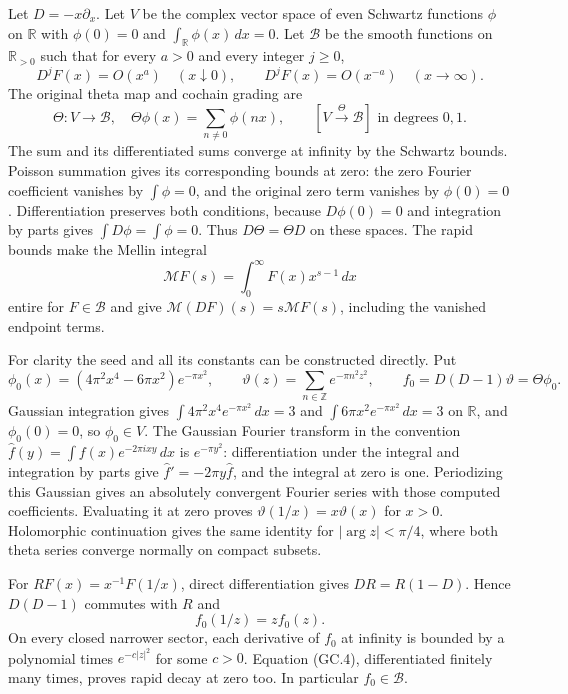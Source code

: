 \documentclass[11pt,a4paper]{article}
\begin{document}
Let $D=-x\partial_x$. Let $V$ be the complex vector space of even
Schwartz functions $\phi$ on $\mathbb R$ with
$\phi(0)=0$ and $\int_{\mathbb R}\phi(x)\,dx=0$. Let $\mathscr B$ be
the smooth functions on $\mathbb R_{>0}$ such that for every
$a>0$ and every integer $j\ge0$,
\[
 D^jF(x)=O(x^a)\quad(x\downarrow0),\qquad
 D^jF(x)=O(x^{-a})\quad(x\to\infty).
\]
The original theta map and cochain grading are
\[
 \Theta:V\longrightarrow\mathscr B,\quad
 \Theta\phi(x)=\sum_{n\ne0}\phi(nx),\qquad
 [V\xrightarrow{\Theta}\mathscr B]\text{ in degrees }0,1.
                                                               \tag{GC.2}
\]
The sum and its differentiated sums converge at infinity by the
Schwartz bounds. Poisson summation gives its corresponding bounds at
zero: the zero Fourier coefficient vanishes by $\int\phi=0$, and
the original zero term vanishes by $\phi(0)=0$. Differentiation
preserves both conditions, because $D\phi(0)=0$ and integration by
parts gives $\int D\phi=\int\phi=0$. Thus $D\Theta=\Theta D$ on
these spaces. The rapid bounds make the Mellin integral
\[
 \mathcal MF(s)=\int_0^\infty F(x)x^{s-1}\,dx
\]
entire for $F\in\mathscr B$ and give
$\mathcal M(DF)(s)=s\mathcal MF(s)$, including the vanished endpoint
terms.

For clarity the seed and all its constants can be constructed directly.
Put
\[
 \phi_0(x)=(4\pi^2x^4-6\pi x^2)e^{-\pi x^2},\qquad
 \vartheta(z)=\sum_{n\in\mathbb Z}e^{-\pi n^2z^2},\qquad
 f_0=D(D-1)\vartheta=\Theta\phi_0.                              \tag{GC.3}
\]
Gaussian integration gives $\int4\pi^2x^4e^{-\pi x^2}\,dx=3$ and
$\int6\pi x^2e^{-\pi x^2}\,dx=3$ on $\mathbb R$, and
$\phi_0(0)=0$, so $\phi_0\in V$. The Gaussian Fourier transform
in the convention $\widehat f(y)=\int f(x)e^{-2\pi ixy}\,dx$ is
$e^{-\pi y^2}$: differentiation under the integral and integration by
parts give $\widehat f'=-2\pi y\widehat f$, and the integral at zero
is one. Periodizing this Gaussian gives an absolutely convergent
Fourier series with those computed coefficients. Evaluating it at zero
proves $\vartheta(1/x)=x\vartheta(x)$ for $x>0$. Holomorphic
continuation gives the same identity for $|\arg z|<\pi/4$, where
both theta series converge normally on compact subsets.

For $RF(x)=x^{-1}F(1/x)$, direct differentiation gives
$DR=R(1-D)$. Hence $D(D-1)$ commutes with $R$ and
\[
 f_0(1/z)=z f_0(z).                                             \tag{GC.4}
\]
On every closed narrower sector, each derivative of $f_0$ at infinity
is bounded by a polynomial times $e^{-c|z|^2}$ for some $c>0$.
Equation (GC.4), differentiated finitely many times, proves rapid
decay at zero too. In particular $f_0\in\mathscr B$.
\end{document}
